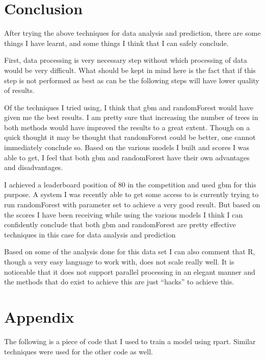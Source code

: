 \documentclass[paper=a4, fontsize=11pt]{scrartcl}	%
\numberwithin{equation}{section}		%
\numberwithin{figure}{section}			%
\numberwithin{table}{section}				%
\begin{document}
\section{Conclusion}

After trying the above techniques for data analysis and prediction, there are some things I have learnt, and some things I think that I can safely conclude.

First, data processing is very necessary step without which processing of data would be very difficult. What should be kept in mind here is the fact that if this step is not performed as best as can be the following steps will have lower quality of results.

Of the techniques I tried using, I think that gbm and randomForest would have given me the best results. I am pretty sure that increasing the number of trees in both methods would have improved the results to a great extent. Though on a quick thought it may be thought that randomForest could be better, one cannot immediately conclude so. Based on the various models I built and scores I was able to get, I feel that both gbm and randomForest have their own advantages and disadvantages.

I achieved a leaderboard position of 80 in the competition and used gbm for this purpose. A system I was recently able to get some access to is currently trying to run randomForest with parameter set to achieve a very good result. But based on the scores I have been receiving while using the various models I think I can confidently conclude that both gbm and randomForest are pretty effective techniques in this case for data analysis and prediction

Based on some of the analysis done for this data set I can also comment that R, though a very easy language to work with, does not scale really well. It is noticeable that it does not support parallel processing in an elegant manner and the methods that do exist to achieve this are just ``hacks'' to achieve this.

\section{Appendix}

The following is a piece of code that I used to train a model using rpart. Similar techniques were used for the other code as well.
\end{document}
